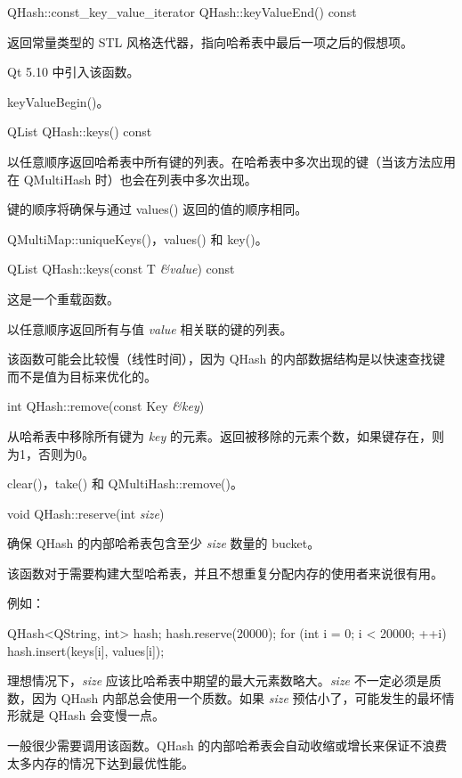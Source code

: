 QHash::const\_key\_value\_iterator QHash::keyValueEnd() const

返回常量类型的 STL 风格迭代器，指向哈希表中最后一项之后的假想项。

Qt 5.10 中引入该函数。

\begin{seeAlso}
keyValueBegin()。
\end{seeAlso}

QList QHash::keys() const

以任意顺序返回哈希表中所有键的列表。在哈希表中多次出现的键（当该方法应用在 QMultiHash 时）也会在列表中多次出现。

键的顺序将确保与通过 values() 返回的值的顺序相同。


\begin{seeAlso}
QMultiMap::uniqueKeys()，values() 和 key()。
\end{seeAlso}

QList QHash::keys(const T \emph{\&value}) const

这是一个重载函数。

以任意顺序返回所有与值 \emph{value} 相关联的键的列表。

该函数可能会比较慢（线性时间），因为 QHash 的内部数据结构是以快速查找键而不是值为目标来优化的。

int QHash::remove(const Key \emph{\&key})

从哈希表中移除所有键为 \emph{key} 的元素。返回被移除的元素个数，如果键存在，则为1，否则为0。


\begin{seeAlso}
clear()，take() 和 QMultiHash::remove()。
\end{seeAlso}


void QHash::reserve(int \emph{size})

确保 QHash 的内部哈希表包含至少 \emph{size} 数量的 bucket。

该函数对于需要构建大型哈希表，并且不想重复分配内存的使用者来说很有用。

例如：

\begin{cppcode}
QHash<QString, int> hash;
hash.reserve(20000);
for (int i = 0; i < 20000; ++i)
    hash.insert(keys[i], values[i]);
\end{cppcode}

理想情况下，\emph{size} 应该比哈希表中期望的最大元素数略大。\emph{size} 不一定必须是质数，因为 QHash 内部总会使用一个质数。如果 \emph{size} 预估小了，可能发生的最坏情形就是 QHash 会变慢一点。

一般很少需要调用该函数。QHash 的内部哈希表会自动收缩或增长来保证不浪费太多内存的情况下达到最优性能。

